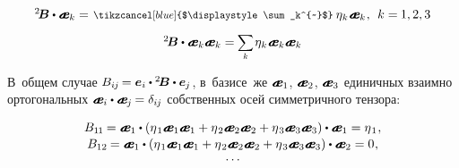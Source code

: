 \begin{otherlanguage}{russian}
\nopagebreak\vspace{-0.25em}\begin{equation*}\begin{array}{c}
{^2\!\bm{B}} \dotp \mathboldae_k = \hspace{.2ex} \scalebox{0.82}{$\tikzcancel[blue]{$\displaystyle\sum_k^{~}$}$}\: \eigenvalue_{\hspace{-0.15ex}k} \hspace{.1ex} \mathboldae_k \hspace{.1ex}, \:\: k =\hspace{-0.1ex} 1, 2, 3
\\[.9em]
%
{^2\!\bm{B}} \dotp \tikzmark{BeginEqualsEBrace} {\mathboldae_k \mathboldae_k} \tikzmark{EndEqualsEBrace} = \hspace{-0.1ex} \scalebox{0.9}{$\displaystyle \sum_{\smash{k}}$} \hspace{.2ex} \eigenvalue_{\hspace{-0.15ex}k} \hspace{.1ex} \mathboldae_k \mathboldae_k
\end{array}\end{equation*}

\vspace{-0.25em} В~общем случае ${B_{i\hspace{-0.1ex}j} \hspace{-0.2ex} = \bm{e}_i \dotp {^2\!\bm{B}} \dotp \bm{e}_{\hspace{-0.1ex}j}}$, в~базисе~же ${\mathboldae_1}$, ${\mathboldae_2}$, ${\mathboldae_3}$ единичных взаимно ортогональных ${\mathboldae_i \dotp \mathboldae_{\hspace{-0.1ex}j} \hspace{-0.15ex} = \delta_{i\hspace{-0.1ex}j}}$ собственных осей симметричного тензора:

\nopagebreak\vspace{-0.2em}\begin{equation*}\begin{array}{c}
B_{1\hspace{-0.12ex}1} \hspace{-0.12ex} = \mathboldae_1 \dotp \left({\eigenvalue_1 \mathboldae_1 \mathboldae_1 + \eigenvalue_2 \mathboldae_2 \mathboldae_2 + \eigenvalue_3 \mathboldae_3 \mathboldae_3}\right) \dotp \mathboldae_1 = \eigenvalue_1
\hspace{.1ex} ,
\\[.1em]
B_{12} \hspace{-0.12ex} = \mathboldae_1 \dotp \left({\eigenvalue_1 \mathboldae_1 \mathboldae_1 + \eigenvalue_2 \mathboldae_2 \mathboldae_2 + \eigenvalue_3 \mathboldae_3 \mathboldae_3}\right) \dotp \mathboldae_2 = 0
\hspace{.1ex} ,
\\[-0.2em]
\ldots
\end{array}\end{equation*}


\end{otherlanguage}

